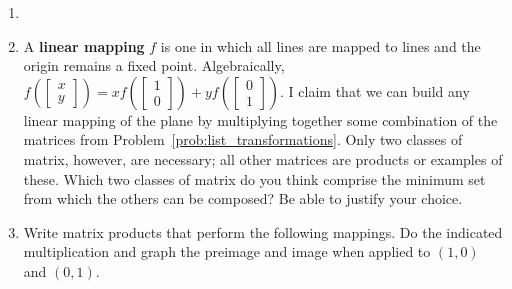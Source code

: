 \documentclass[../gatm.tex]{subfiles}
\begin{document}
\begin{enumerate}
\setcounter{enumi}{\value{bruh_count}}
\item[]
\begin{enumerate}
\end{enumerate}
\item A \textbf{linear mapping} $f$ is one in which all lines are mapped to lines and the origin remains a fixed point. Algebraically, $f\left(\left[\begin{array}{c}x \\ y \end{array}\right]\right)=xf\left(\left[\begin{array}{c}1 \\ 0 \end{array}\right]\right)+yf\left(\left[\begin{array}{c}0 \\ 1 \end{array}\right]\right).$ I claim that we can build any linear mapping of the plane by multiplying together some combination of the matrices from Problem~\ref{prob:list_transformations}. Only two classes of matrix, however, are necessary; all other matrices are products or examples of these. Which two classes of matrix do you think comprise the minimum set from which the others can be composed? Be able to justify your choice.
\item Write matrix products that perform the following mappings. Do the indicated multiplication and graph the preimage and image when applied to $(1,0)$ and $(0,1)$.

\end{enumerate}
\end{document}
